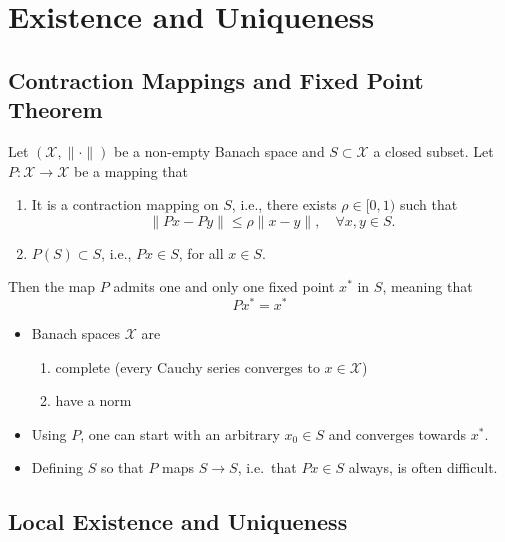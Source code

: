 \section{Existence and Uniqueness}

\subsection{Contraction Mappings and Fixed Point Theorem}

Let $(\mathcal{X}, \|\cdot\|)$ be a non-empty Banach space and $S \subset \mathcal{X}$ a
closed subset. Let $P : \mathcal{X} \to \mathcal{X}$ be a mapping that

\begin{enumerate}
    \item It is a contraction mapping on $S$, i.e., there exists $\rho \in [0, 1)$ such that
          \noindent\begin{equation*}
              \|P x - P y\| \leq \rho \|x - y\|, \quad \forall x, y \in S.
          \end{equation*}
    \item $P(S) \subset S$, i.e., $P x \in S$, for all $x \in S$.
\end{enumerate}

Then the map $P$ admits one and only one fixed point $x^*$ in $S$, meaning that
\noindent\begin{equation*}
    P x^* = x^*
\end{equation*}


\newpar{}

\begin{itemize}
    \item Banach spaces $\mathcal{X}$ are
          \begin{enumerate}
              \item complete (every Cauchy series converges to $x\in \mathcal{X}$)
              \item have a norm
          \end{enumerate}
    \item Using $P$, one can start with an arbitrary $x_0\in S$ and converges towards $x^*$.
    \item Defining $S$ so that $P$ maps $S \to S$, i.e.\ that $Px \in S$ always, is often difficult.
\end{itemize}

\subsection{Local Existence and Uniqueness}

